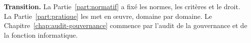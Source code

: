 \bigskip

\begin{boxinfo}
\textbf{Transition.} La Partie~\ref{part:normatif} a fixé les normes, les
critères et le droit. La Partie~\ref{part:pratique} les met en œuvre,
domaine par domaine. Le Chapitre~\ref{chap:audit-gouvernance} commence par
l'audit de la gouvernance et de la fonction informatique.
\end{boxinfo}
